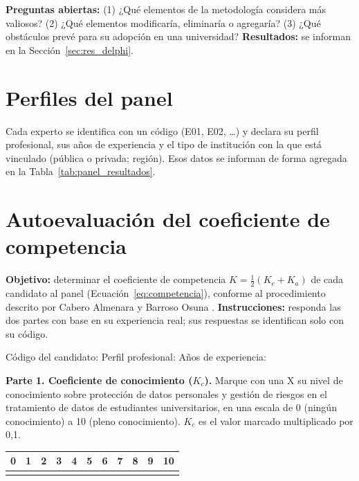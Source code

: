 \noindent\textbf{Preguntas abiertas:} (1) ¿Qué elementos de la metodología considera más valiosos? (2) ¿Qué elementos modificaría, eliminaría o agregaría? (3) ¿Qué obstáculos prevé para su adopción en una universidad? \textbf{Resultados:} se informan en la Sección~\ref{sec:res_delphi}.

\label{anx:expertos}

\section{Perfiles del panel}

Cada experto se identifica con un código (E01, E02, \ldots) y declara su perfil profesional, sus años de experiencia y el tipo de institución con la que está vinculado (pública o privada; región). Esos datos se informan de forma agregada en la Tabla~\ref{tab:panel_resultados}.

\section{Autoevaluación del coeficiente de competencia}

\textbf{Objetivo:} determinar el coeficiente de competencia $K = \frac{1}{2}(K_c + K_a)$ de cada candidato al panel (Ecuación~\ref{eq:competencia}), conforme al procedimiento descrito por Cabero Almenara y Barroso Osuna \cite{cabero2013competencia}. \textbf{Instrucciones:} responda las dos partes con base en su experiencia real; sus respuestas se identifican solo con su código.

\vspace{6pt}
\noindent Código del candidato: \linea{2cm} \quad Perfil profesional: \linea{4.5cm} \quad Años de experiencia: \linea{1.5cm}

\vspace{6pt}
\noindent\textbf{Parte 1. Coeficiente de conocimiento ($K_c$).} Marque con una X su nivel de conocimiento sobre protección de datos personales y gestión de riesgos en el tratamiento de datos de estudiantes universitarios, en una escala de 0 (ningún conocimiento) a 10 (pleno conocimiento). $K_c$ es el valor marcado multiplicado por 0,1.

\begin{center}
\small
\renewcommand{\arraystretch}{1.4}
\begin{tabular}{|c|c|c|c|c|c|c|c|c|c|c|}
  \hline
  0 & 1 & 2 & 3 & 4 & 5 & 6 & 7 & 8 & 9 & 10 \\
  \hline
  & & & & & & & & & & \\
  \hline
\end{tabular}
\end{center}

